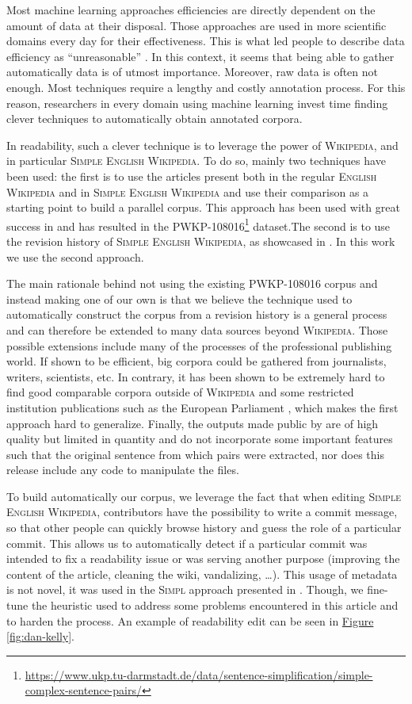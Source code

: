 \documentclass[a4paper, 11pt, onepage]{scrreprt}
\newcommand\wiki{\textsc{Wikipedia}}
\newcommand\ew{\textsc{English Wikipedia}}
\newcommand\sew{\textsc{Simple English Wikipedia}}
\newcommand\figureref[1]{\hyperref[#1]{Figure \ref*{#1}}}
\begin{document}
Most machine learning approaches efficiencies are directly dependent
on the amount of data at their disposal. Those approaches are used in
more scientific domains every day for their effectiveness. This is
what led people to describe data efficiency as “unreasonable”
\cite{halevy2009unreasonable}. In this context, it seems that being
able to gather automatically data is of utmost importance. Moreover,
raw data is often not enough. Most techniques require a lengthy and
costly annotation process. For this reason, researchers in every
domain using machine learning invest time finding clever techniques to
automatically obtain annotated corpora.

In readability, such a clever technique is to leverage the power of
\wiki, and in particular \sew. To do so, mainly two techniques have
been used: the first is to use the articles present both in the
regular \ew{} and in \sew{} and use their comparison as a starting
point to build a parallel corpus. This approach has been used with
great success in \cite{zhu-bernhard-gurevych:2010:PAPERS} and has
resulted in the
PWKP-108016\footnote{\url{https://www.ukp.tu-darmstadt.de/data/sentence-simplification/simple-complex-sentence-pairs/}}
dataset.The second is to use the revision history of \sew, as
showcased in \cite{yatskar2010sake}. In this work we use the second
approach.

The main rationale behind not using the existing PWKP-108016 corpus
and instead making one of our own is that we believe the technique
used to automatically construct the corpus from a revision history is
a general process and can therefore be extended to many data sources
beyond \wiki. Those possible extensions include many of the processes
of the professional publishing world. If shown to be efficient, big
corpora could be gathered from journalists, writers, scientists, etc.
In contrary, it has been shown to be extremely hard to find good
comparable corpora outside of \wiki{} and some restricted institution
publications such as the European Parliament \cite{koehn2005europarl},
which makes the first approach hard to generalize. Finally, the
outputs made public by \cite{yatskar2010sake} are of high quality but
limited in quantity and do not incorporate some important features
such that the original sentence from which pairs were extracted, nor
does this release include any code to manipulate the files.

To build automatically our corpus, we leverage the fact that when
editing \sew, contributors have the possibility to write a commit
message, so that other people can quickly browse history and guess the
role of a particular commit. This allows us to automatically detect if
a particular commit was intended to fix a readability issue or was
serving another purpose (improving the content of the article,
cleaning the wiki, vandalizing, …). This usage of metadata is not
novel, it was used in the \textsc{Simpl} approach presented in
\cite{yatskar2010sake}. Though, we fine-tune the heuristic used to
address some problems encountered in this article and to harden the
process. An example of readability edit can be seen in
\figureref{fig:dan-kelly}.
\end{document}
